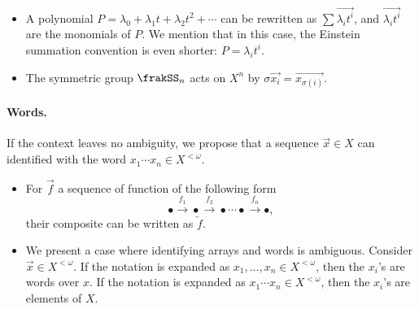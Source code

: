 \documentclass[a4paper, 8pt]{article}
\begin{document}
\begin{multicols}{2}
\begin{examples*}
	\begin{itemize}
		\item A polynomial $P = \lambda_0 + \lambda_1 t + \lambda_2 t^2 + \cdots$ can be rewritten as $\sum \overrightarrow{\lambda_i t^i}$, and $\overrightarrow{\lambda_i t^i}$ are the monomials of $P$. We mention that in this case, the Einstein summation convention is even shorter: $P = \lambda_i t^i$.
		\item The symmetric group $\frakSS_n$ acts on $X^n$ by $\sigma \overrightarrow{x_i} = \overrightarrow{x_{\sigma (i)}}$.
	\end{itemize}
\end{examples*}

\paragraph{Words.} If the context leaves no ambiguity, we propose that a sequence $\overrightarrow{x} \in X$ can identified with the word $x_1 \cdots x_n \in X^{< \omega}$.

\begin{examples*}
	\begin{itemize}
		\item For $\overrightarrow{f}$ a sequence of function of the following form
			\[ \bullet \xrightarrow{f_1} \bullet \xrightarrow{f_2} \bullet \cdots \bullet \xrightarrow{f_n} \bullet , \]
			their composite can be written as $\overleftarrow{f}$.
		\item We present a case where identifying arrays and words is ambiguous. Consider $\overrightarrow{x} \in X^{< \omega}$. If the notation is expanded as $x_1, \ldots, x_n \in X^{< \omega}$, then the $x_i$'s are words over $x$. If the notation is expanded as $x_1 \cdots x_n \in X^{< \omega}$, then the $x_i$'s are elements of $X$.
	\end{itemize}
\end{examples*}



\end{multicols}
\end{document}

